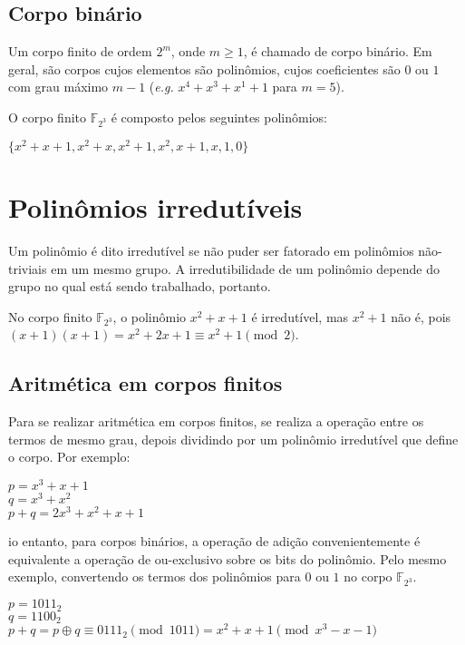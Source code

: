 \documentclass[12pt]{article}
\begin{document}
\subsection{Corpo binário}

Um corpo finito de ordem $2^{m}$, onde $m \geq 1$, é chamado de corpo binário.
Em geral, são corpos cujos elementos são polinômios, cujos coeficientes são $0$
ou $1$ com grau máximo $m-1$ (\textit{e.g.} $x^{4} + x^{3} + x^{1} + 1$ para
$m = 5$).

O corpo finito $\mathbb{F}_{2^{3}}$ é composto pelos seguintes polinômios:

\begin{center}
    $\{x^{2}+x+1, x^{2}+x, x^{2}+1, x^{2}, x+1, x, 1, 0\}$
\end{center}

\section{Polinômios irredutíveis}

Um polinômio é dito irredutível se não puder ser fatorado em polinômios
não-triviais em um mesmo grupo. A irredutibilidade de um polinômio depende do
grupo no qual está sendo trabalhado, portanto.

No corpo finito $\mathbb{F}_{2^{3}}$, o polinômio $x^{2}+x+1$ é irredutível,
mas $x^{2}+1$ não é, pois $(x+1)(x+1) = x^{2}+2x+1 \equiv x^{2}+1 \pmod{2}$.

\subsection{Aritmética em corpos finitos}

Para se realizar aritmética em corpos finitos, se realiza a operação entre os
termos de mesmo grau, depois dividindo por um polinômio irredutível que define
o corpo. Por exemplo:

\begin{center}
    $p = x^{3}+x+1$ \\
    $q = x^{3}+x^{2}$ \\
    $p+q = 2x^{3}+x^{2}+x+1$
\end{center}

io entanto, para corpos binários, a operação de adição convenientemente é
equivalente a operação de ou-exclusivo sobre os bits do polinômio. Pelo mesmo
exemplo, convertendo os termos dos polinômios para $0$ ou $1$ no corpo
$\mathbb{F}_{2^{3}}$.

\begin{center}
    $p = {1011}_2$ \\
    $q = {1100}_2$ \\
    $p+q = p \oplus q \equiv {0111}_2 \pmod{1011} = x^{2}+x+1 \pmod{x^{3}-x-1}$
\end{center}
\end{document}
